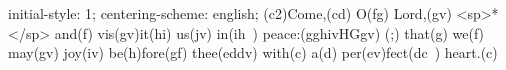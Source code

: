 initial-style: 1;
centering-scheme: english;
(c2)Come,(cd) O(fg) Lord,(gv) <sp>*</sp> and(f) vis(gv)it(hi) us(jv) in(ih~) peace:(gghivHGgv) (;) that(g) we(f) may(gv) joy(iv) be(h)fore(gf) thee(eddv) with(c) a(d) per(ev)fect(dc~) heart.(c)
